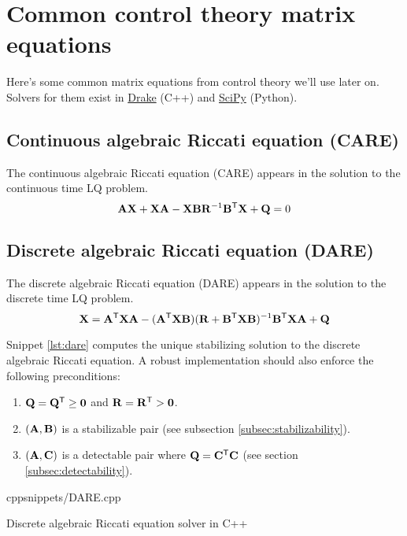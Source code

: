 \section{Common control theory matrix equations}

Here's some common matrix equations from control theory we'll use later on.
Solvers for them exist in \href{https://github.com/RobotLocomotion/drake}{Drake}
(C++) and \href{https://github.com/scipy/scipy}{SciPy} (Python).

\subsection{Continuous algebraic Riccati equation (CARE)}

The continuous algebraic Riccati equation (CARE) appears in the solution to the
continuous time LQ problem.
\begin{equation}
  \mathbf{A}\mathbf{X} + \mathbf{X}\mathbf{A} - \mathbf{X}\mathbf{B}\mathbf{R}^{-1}\mathbf{B}^\mathsf{T}\mathbf{X} +
    \mathbf{Q} = 0
\end{equation}

\subsection{Discrete algebraic Riccati equation (DARE)}

The discrete algebraic Riccati equation (DARE) appears in the solution to the
discrete time LQ problem.
\begin{equation}
  \mathbf{X} = \mathbf{A}^\mathsf{T}\mathbf{X}\mathbf{A} - (\mathbf{A}^\mathsf{T}\mathbf{X}\mathbf{B})(\mathbf{R} +
    \mathbf{B}^\mathsf{T}\mathbf{X}\mathbf{B})^{-1} \mathbf{B}^\mathsf{T}\mathbf{X}\mathbf{A} + \mathbf{Q}
\end{equation}

Snippet \ref{lst:dare} computes the unique stabilizing solution to the discrete
algebraic Riccati equation. A robust implementation should also enforce the
following preconditions:
\begin{enumerate}
  \item $\mathbf{Q} = \mathbf{Q}^\mathsf{T} \geq \mathbf{0}$ and $\mathbf{R} = \mathbf{R}^\mathsf{T} > \mathbf{0}$.
  \item $(\mathbf{A}, \mathbf{B})$ is a stabilizable pair (see subsection
    \ref{subsec:stabilizability}).
  \item $(\mathbf{A}, \mathbf{C})$ is a detectable pair where
    $\mathbf{Q} = \mathbf{C}^\mathsf{T}\mathbf{C}$ (see section \ref{subsec:detectability}).
\end{enumerate}
\begin{coderemote}{cpp}{snippets/DARE.cpp}
  \caption{Discrete algebraic Riccati equation solver in C++}
  \label{lst:dare}
\end{coderemote}

